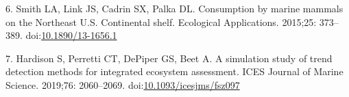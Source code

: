 \documentclass[
  10pt,
]{article}
\begin{document}
\leavevmode\hypertarget{ref-smith_consumption_2015}{}%
6. Smith LA, Link JS, Cadrin SX, Palka DL. Consumption by marine mammals
on the Northeast U.S. Continental shelf. Ecological Applications.
2015;25: 373--389.
doi:\href{https://doi.org/10.1890/13-1656.1}{10.1890/13-1656.1}

\leavevmode\hypertarget{ref-hardison_simulation_2019}{}%
7. Hardison S, Perretti CT, DePiper GS, Beet A. A simulation study of
trend detection methods for integrated ecosystem assessment. ICES
Journal of Marine Science. 2019;76: 2060--2069.
doi:\href{https://doi.org/10.1093/icesjms/fsz097}{10.1093/icesjms/fsz097}
\end{document}
